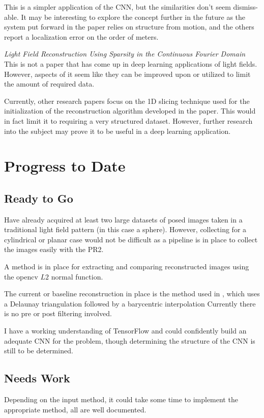 \documentclass[12pt]{report}
\begin{document}
This is a simpler application of the CNN, but the similarities don't seem dismiss-able. It may be interesting to explore the concept further in the future as the system put forward in the paper relies on structure from motion, and the others report a localization error on the order of meters. 

\emph{Light Field Reconstruction Using Sparsity in the Continuous Fourier Domain}
This is not a paper that has come up in deep learning applications of light fields. However, aspects of it seem like they can be improved upon or utilized to limit the amount of required data.

Currently, other research papers focus on the 1D slicing technique used for the initialization of the reconstruction algorithm developed in the paper. This would in fact limit it to requiring a very structured dataset. However, further research into the subject may prove it to be useful in a deep learning application.

\section*{Progress to Date}
\subsection*{Ready to Go}
Have already acquired at least two large datasets of posed images taken in a traditional light field pattern (in this case a sphere). However, collecting for a cylindrical or planar case would not be difficult as a pipeline is in place to collect the images easily with the PR2.

A method is in place for extracting and comparing reconstructed images using the opencv $L2$ normal function. 

The current or baseline reconstruction in place is the method used in \cite{Davis12}, which uses a Delaunay triangulation followed by a barycentric interpolation Currently there is no pre or post filtering involved.

I have a working understanding of TensorFlow and could confidently build an adequate CNN for the problem, though determining the structure of the CNN is still to be determined. 

\subsection*{Needs Work}
Depending on the input method, it could take some time to implement the appropriate method, all are well documented.
\end{document}
